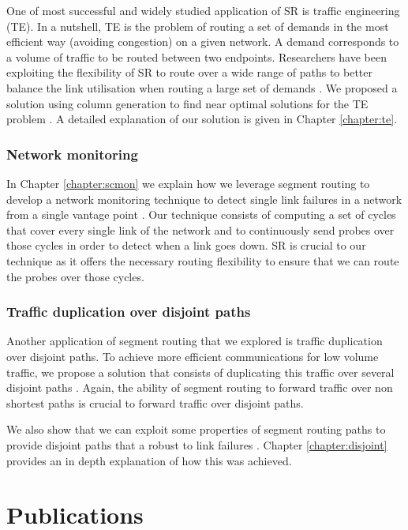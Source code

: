 One of most successful and widely studied application of SR is traffic engineering (TE).
In a nutshell, TE is the problem of routing a set of demands in the most efficient way (avoiding congestion) on a given
network. A demand corresponds to a volume of traffic to be routed between two endpoints. Researchers
have been exploiting the flexibility of SR to route over a wide range of paths to better balance
the link utilisation when routing a large set of demands \cite{defo, hartert2015solving, steven, bhatia}.
We proposed a solution using column generation to find near optimal solutions for the TE problem \cite{CG4SR}.
A detailed explanation of our solution is given in Chapter \ref{chapter:te}.

\subsubsection*{Network monitoring}

In Chapter \ref{chapter:scmon} we explain how we
leverage segment routing to develop a network monitoring technique to detect single link failures
in a network from a single vantage point \cite{scmon}. Our technique consists of computing a set of cycles that cover
every single link of the network and to continuously send probes over those cycles in order to detect when a 
link goes down. SR is crucial to our technique as it offers the necessary routing flexibility to ensure
that we can route the probes over those cycles. 

\subsubsection*{Traffic duplication over disjoint paths}

Another application of segment routing that we explored is traffic duplication over disjoint paths.
To achieve more efficient communications for low volume traffic, we propose a solution that consists of duplicating this
traffic over several disjoint paths \cite{duplication}. Again, the ability of segment routing to forward
traffic over non shortest paths is crucial to forward traffic over disjoint paths.

We also show that we can exploit some properties of segment routing paths to provide disjoint paths that a 
robust to link failures \cite{rdp}. Chapter \ref{chapter:disjoint} provides an in depth explanation of how this
was achieved.


\section{Publications}

